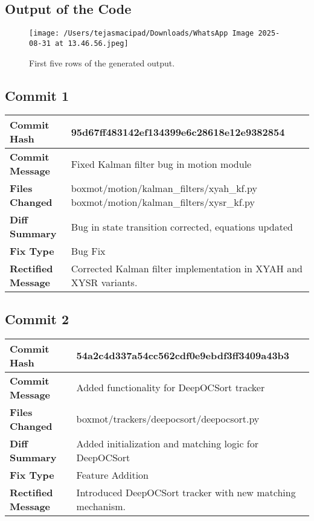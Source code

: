 \documentclass[12pt,a4paper]{article}
\begin{document}
\subsection*{Output of the Code}

\begin{figure}[h!]
    \centering
    \texttt{[image: /Users/tejasmacipad/Downloads/WhatsApp Image 2025-08-31 at 13.46.56.jpeg]}
    \caption{First five rows of the generated output.}
\end{figure}


\subsection*{Commit 1}
\begin{tabular}{|p{3cm}|p{10cm}|}
\hline
\textbf{Commit Hash} & 95d67ff483142ef134399e6c28618e12e9382854 \\
\hline
\textbf{Commit Message} & Fixed Kalman filter bug in motion module \\
\hline
\textbf{Files Changed} & 
boxmot/motion/kalman\_filters/xyah\_kf.py \newline
boxmot/motion/kalman\_filters/xysr\_kf.py \\
\hline
\textbf{Diff Summary} & Bug in state transition corrected, equations updated \\
\hline
\textbf{Fix Type} & Bug Fix \\
\hline
\textbf{Rectified Message} & Corrected Kalman filter implementation in XYAH and XYSR variants. \\
\hline
\end{tabular}

\vspace{1cm}

\subsection*{Commit 2}
\begin{tabular}{|p{3cm}|p{10cm}|}
\hline
\textbf{Commit Hash} & 54a2c4d337a54cc562cdf0e9ebdf3ff3409a43b3 \\
\hline
\textbf{Commit Message} & Added functionality for DeepOCSort tracker \\
\hline
\textbf{Files Changed} & 
boxmot/trackers/deepocsort/deepocsort.py \\
\hline
\textbf{Diff Summary} & Added initialization and matching logic for DeepOCSort \\
\hline
\textbf{Fix Type} & Feature Addition \\
\hline
\textbf{Rectified Message} & Introduced DeepOCSort tracker with new matching mechanism. \\
\hline
\end{tabular}
\end{document}

